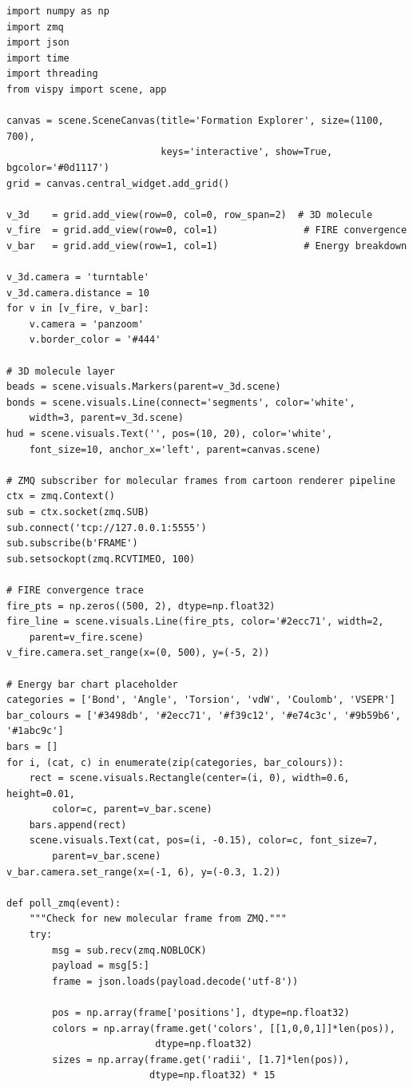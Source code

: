 \documentclass[11pt,a4paper]{article}
\begin{document}
\begin{lstlisting}[title={\textbf{Live Molecular Formation Explorer}}]
import numpy as np
import zmq
import json
import time
import threading
from vispy import scene, app

canvas = scene.SceneCanvas(title='Formation Explorer', size=(1100, 700),
                           keys='interactive', show=True, bgcolor='#0d1117')
grid = canvas.central_widget.add_grid()

v_3d    = grid.add_view(row=0, col=0, row_span=2)  # 3D molecule
v_fire  = grid.add_view(row=0, col=1)               # FIRE convergence
v_bar   = grid.add_view(row=1, col=1)               # Energy breakdown

v_3d.camera = 'turntable'
v_3d.camera.distance = 10
for v in [v_fire, v_bar]:
    v.camera = 'panzoom'
    v.border_color = '#444'

# 3D molecule layer
beads = scene.visuals.Markers(parent=v_3d.scene)
bonds = scene.visuals.Line(connect='segments', color='white',
    width=3, parent=v_3d.scene)
hud = scene.visuals.Text('', pos=(10, 20), color='white',
    font_size=10, anchor_x='left', parent=canvas.scene)

# ZMQ subscriber for molecular frames from cartoon renderer pipeline
ctx = zmq.Context()
sub = ctx.socket(zmq.SUB)
sub.connect('tcp://127.0.0.1:5555')
sub.subscribe(b'FRAME')
sub.setsockopt(zmq.RCVTIMEO, 100)

# FIRE convergence trace
fire_pts = np.zeros((500, 2), dtype=np.float32)
fire_line = scene.visuals.Line(fire_pts, color='#2ecc71', width=2,
    parent=v_fire.scene)
v_fire.camera.set_range(x=(0, 500), y=(-5, 2))

# Energy bar chart placeholder
categories = ['Bond', 'Angle', 'Torsion', 'vdW', 'Coulomb', 'VSEPR']
bar_colours = ['#3498db', '#2ecc71', '#f39c12', '#e74c3c', '#9b59b6', '#1abc9c']
bars = []
for i, (cat, c) in enumerate(zip(categories, bar_colours)):
    rect = scene.visuals.Rectangle(center=(i, 0), width=0.6, height=0.01,
        color=c, parent=v_bar.scene)
    bars.append(rect)
    scene.visuals.Text(cat, pos=(i, -0.15), color=c, font_size=7,
        parent=v_bar.scene)
v_bar.camera.set_range(x=(-1, 6), y=(-0.3, 1.2))

def poll_zmq(event):
    """Check for new molecular frame from ZMQ."""
    try:
        msg = sub.recv(zmq.NOBLOCK)
        payload = msg[5:]
        frame = json.loads(payload.decode('utf-8'))

        pos = np.array(frame['positions'], dtype=np.float32)
        colors = np.array(frame.get('colors', [[1,0,0,1]]*len(pos)),
                          dtype=np.float32)
        sizes = np.array(frame.get('radii', [1.7]*len(pos)),
                         dtype=np.float32) * 15


\end{lstlisting}
\end{document}
